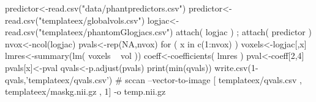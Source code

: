 predictor<-read.csv("data/phantpredictors.csv")
predictor<-read.csv("templateex/globalvols.csv")
logjac<-read.csv("templateex/phantomGlogjacs.csv")
attach( logjac ) ; attach( predictor )
nvox<-ncol(logjac)
pvals<-rep(NA,nvox)
for ( x in c(1:nvox) ) 
{ 
  voxels<-logjac[,x]
  lmres<-summary(lm( voxels ~  vol ))
  coeff<-coefficients( lmres )
  pval<-coeff[2,4]
  pvals[x]<-pval
}
qvals<-p.adjust(pvals)
print(min(qvals))
write.csv(1-qvals,'templateex/qvals.csv')
# sccan --vector-to-image [ templateex/qvals.csv , templateex/maskg.nii.gz , 1] -o temp.nii.gz

